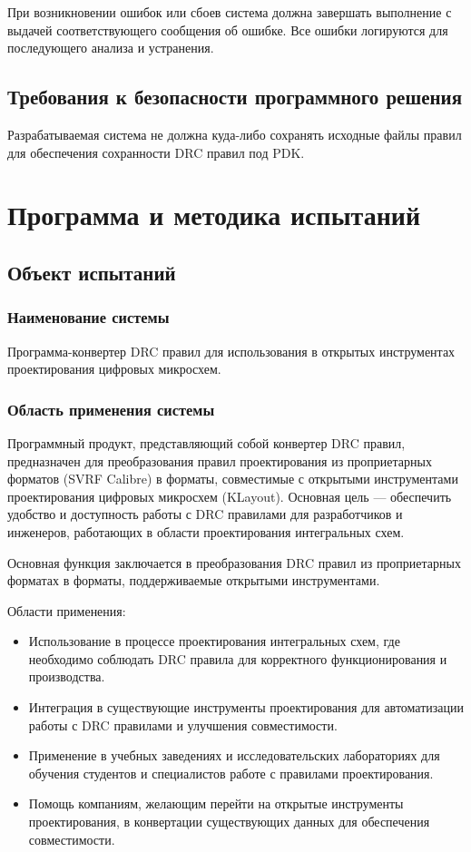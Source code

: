 При возникновении ошибок или сбоев система должна завершать выполнение
с выдачей соответствующего сообщения об ошибке.
Все ошибки логируются для последующего анализа и устранения.

\subsection{Требования к безопасности программного решения}

Разрабатываемая система не должна куда-либо сохранять исходные файлы правил
для обеспечения сохранности DRC правил под PDK.

\section{Программа и методика испытаний}

\subsection{Объект испытаний}

\subsubsection{Наименование системы}

Программа-конвертер DRC правил для использования
в открытых инструментах проектирования цифровых микросхем.

\subsubsection{Область применения системы}

Программный продукт, представляющий собой конвертер DRC правил,
предназначен для преобразования правил проектирования
из проприетарных форматов (SVRF Calibre) в форматы, совместимые
с открытыми инструментами проектирования цифровых микросхем (KLayout).
Основная цель --- обеспечить удобство
и доступность работы с DRC правилами для разработчиков и инженеров,
работающих в области проектирования интегральных схем.\par
Основная функция заключается в преобразования DRC правил
из проприетарных форматах в форматы,
поддерживаемые открытыми инструментами.

Области применения:

\begin{itemize}
	\item Использование в процессе проектирования интегральных схем,
		где необходимо соблюдать DRC правила
		для корректного функционирования и производства.
	\item Интеграция в существующие инструменты проектирования
		для автоматизации работы с DRC правилами и улучшения совместимости.
	\item Применение в учебных заведениях
		и исследовательских лабораториях для обучения студентов
		и специалистов работе с правилами проектирования.
	\item Помощь компаниям, желающим перейти
		на открытые инструменты проектирования,
		в конвертации существующих данных для обеспечения совместимости.
\end{itemize}

